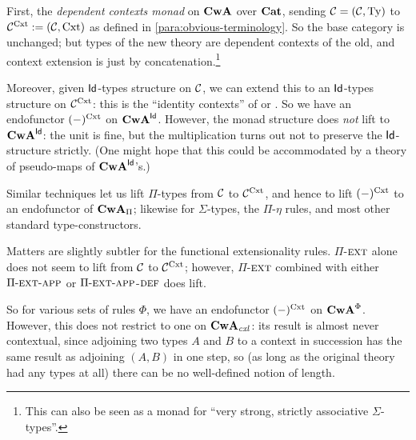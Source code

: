 \begin{para} \label{para:dep-cxt-monad} First, the \emph{dependent contexts monad} on $\mathbf{CwA}$ over $\mathbf{Cat}$, sending $\mathcal{C} = (\mathcal{C},\mathrm{Ty})$ to $\mathcal{C}^{\mathrm{Cxt}} := (\mathcal{C},\mathrm{Cxt})$ as defined in \ref{para:obvious-terminology}.  So the base category is unchanged; but types of the new theory are dependent contexts of the old, and context extension is just by concatenation.\footnote{This can also be seen as a monad for ``very strong, strictly associative $\Sigma$-types''.}

Moreover, given $\mathsf{Id}$-types structure on $\mathcal{C}$, we can extend this to an $\mathsf{Id}$-types structure on $\mathcal{C}^{\mathrm{Cxt}}$: this is the ``identity contexts'' of \cite{streicher:hab} or \cite{gambino-garner}.   So we have an endofunctor $(-)^{\mathrm{Cxt}}$ on $\mathbf{CwA}^{\mathsf{Id}}$. However, the monad structure does \emph{not} lift to $\mathbf{CwA}^{\mathsf{Id}}$: the unit is fine, but the multiplication turns out not to preserve the $\mathsf{Id}$-structure strictly.  (One might hope that this could be accommodated by a theory of pseudo-maps of $\mathbf{CwA}^{\mathsf{Id}}$'s.)

Similar techniques let us lift $\Pi$-types from $\mathcal{C}$ to $\mathcal{C}^{\mathrm{Cxt}}$, and hence to lift $(-)^{\mathrm{Cxt}}$ to an endofunctor of $\mathbf{CwA}_\Pi$; likewise for $\Sigma$-types, the $\Pi$-$\eta$ rules, and most other standard type-constructors.

Matters are slightly subtler for the functional extensionality rules.   $\Pi$-$\textsc{ext}$ alone does not seem to lift from $\mathcal{C}$ to $\mathcal{C}^{\mathrm{Cxt}}$; however, $\Pi$-$\textsc{ext}$ combined with either ${\Pi\mbox{-}\textsc{ext}\mbox{-}\textsc{app}}$ or ${\Pi\mbox{-}\textsc{ext}\mbox{-}\textsc{app}}$-$\textsc{def}$ does lift.

So for various sets of rules $\Phi$, we have an endofunctor $(-)^{\mathrm{Cxt}}$ on $\mathbf{CwA}^\Phi$.  However, this does not restrict to one on $\mathbf{CwA}_{\mathit{cxl}}$: its result is almost never contextual, since adjoining two types $A$ and $B$ to a context in succession has the same result as adjoining $(A,B)$ in one step, so (as long as the original theory had any types at all) there can be no well-defined notion of length.
\end{para}

